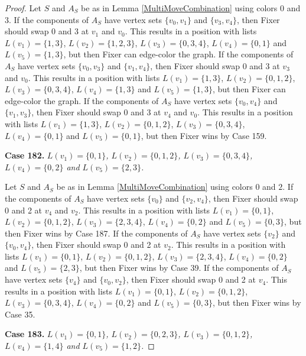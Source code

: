 \documentclass[12pt]{amsart}
\theoremstyle{plain}
\theoremstyle{definition}
\theoremstyle{remark}
\begin{document}
\begin{proof}
Let $S$ and $A_S$ be as in Lemma \ref{MultiMoveCombination} using colors $0$ and $3$. If the components of $A_S$ have vertex sets $\{v_0, v_1\}$ and $\{v_3, v_4\}$, then Fixer should swap 0 and 3 at $v_1$ and $v_0$. This results in a position with lists $L(v_1) = \{1, 3\}$, $L(v_2) = \{1, 2, 3\}$, $L(v_3) = \{0, 3, 4\}$, $L(v_4) = \{0, 1\}$ and $L(v_5) = \{1, 3\}$, but then Fixer can edge-color the graph.
If the components of $A_S$ have vertex sets $\{v_0, v_3\}$ and $\{v_1, v_4\}$, then Fixer should swap 0 and 3 at $v_3$ and $v_0$. This results in a position with lists $L(v_1) = \{1, 3\}$, $L(v_2) = \{0, 1, 2\}$, $L(v_3) = \{0, 3, 4\}$, $L(v_4) = \{1, 3\}$ and $L(v_5) = \{1, 3\}$, but then Fixer can edge-color the graph.
If the components of $A_S$ have vertex sets $\{v_0, v_4\}$ and $\{v_1, v_3\}$, then Fixer should swap 0 and 3 at $v_4$ and $v_0$. This results in a position with lists $L(v_1) = \{1, 3\}$, $L(v_2) = \{0, 1, 2\}$, $L(v_3) = \{0, 3, 4\}$, $L(v_4) = \{0, 1\}$ and $L(v_5) = \{0, 1\}$, but then Fixer wins by Case 159.

\noindent\textbf{Case 182.  }\textit{$L(v_1) = \{0, 1\}$, $L(v_2) = \{0, 1, 2\}$, $L(v_3) = \{0, 3, 4\}$, $L(v_4) = \{0, 2\}$ and $L(v_5) = \{2, 3\}$.}

Let $S$ and $A_S$ be as in Lemma \ref{MultiMoveCombination} using colors $0$ and $2$. If the components of $A_S$ have vertex sets $\{v_0\}$ and $\{v_2, v_4\}$, then Fixer should swap 0 and 2 at $v_4$ and $v_2$. This results in a position with lists $L(v_1) = \{0, 1\}$, $L(v_2) = \{0, 1, 2\}$, $L(v_3) = \{2, 3, 4\}$, $L(v_4) = \{0, 2\}$ and $L(v_5) = \{0, 3\}$, but then Fixer wins by Case 187.
If the components of $A_S$ have vertex sets $\{v_2\}$ and $\{v_0, v_4\}$, then Fixer should swap 0 and 2 at $v_2$. This results in a position with lists $L(v_1) = \{0, 1\}$, $L(v_2) = \{0, 1, 2\}$, $L(v_3) = \{2, 3, 4\}$, $L(v_4) = \{0, 2\}$ and $L(v_5) = \{2, 3\}$, but then Fixer wins by Case 39.
If the components of $A_S$ have vertex sets $\{v_4\}$ and $\{v_0, v_2\}$, then Fixer should swap 0 and 2 at $v_4$. This results in a position with lists $L(v_1) = \{0, 1\}$, $L(v_2) = \{0, 1, 2\}$, $L(v_3) = \{0, 3, 4\}$, $L(v_4) = \{0, 2\}$ and $L(v_5) = \{0, 3\}$, but then Fixer wins by Case 35.

\noindent\textbf{Case 183.  }\textit{$L(v_1) = \{0, 1\}$, $L(v_2) = \{0, 2, 3\}$, $L(v_3) = \{0, 1, 2\}$, $L(v_4) = \{1, 4\}$ and $L(v_5) = \{1, 2\}$.}


\end{proof}
\end{document}
